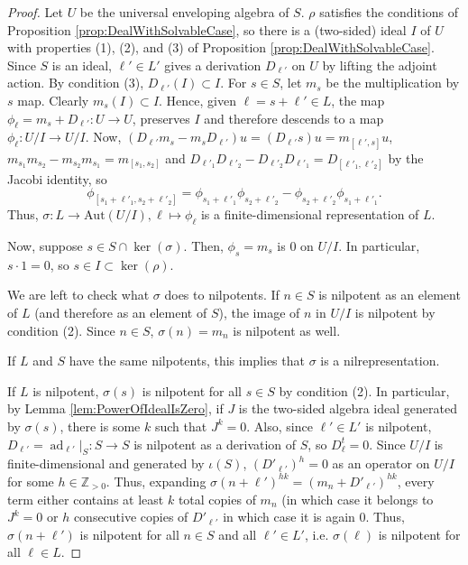 \documentclass[10pt]{amsart}
\theoremstyle{definition}
\theoremstyle{remark}
\numberwithin{equation}{section}
\newcommand{\bbZ}{\mathbb Z}
\DeclareMathOperator{\ad}{ad}
\begin{document}
\begin{proof} Let $U$ be the universal enveloping algebra of $S$.
$\rho$ satisfies the conditions of Proposition \ref{prop:DealWithSolvableCase}, so there is a (two-sided) ideal $I$ of $U$ with properties (1), (2), and (3) of Proposition \ref{prop:DealWithSolvableCase}. Since $S$ is an ideal, $\ell' \in L'$ gives a derivation $D_{\ell'}$ on $U$ by lifting the adjoint action. By condition (3), $D_{\ell'}(I) \subset I$. For $s \in S$, let $m_{s}$ be the multiplication by $s$ map. Clearly $m_{s}(I) \subset I$. Hence, given $\ell = s + \ell' \in L$, the map $\phi_{\ell} = m_{s} + D_{\ell'}: U \to U$, preserves $I$ and therefore descends to a map $\phi_{\ell}: U/I \to U/I$. Now, $(D_{\ell'} m_s - m_s D_{\ell'}) u = (D_{\ell'}s) u  = m_{[\ell',s]} u$, $m_{s_1} m_{s_2} - m_{s_2} m_{s_1}  = m_{[s_1,s_2]}$ and $D_{\ell'_1} D_{\ell'_2} - D_{\ell'_2}D_{\ell'_1} = D_{[\ell'_1, \ell'_2]}$ by the Jacobi identity, so 
\[
\phi_{[s_1 + \ell'_1, s_2 +\ell'_2]} = \phi_{s_1 + \ell'_1} \phi_{s_2 + \ell'_2} - \phi_{s_2 + \ell'_2} \phi_{s_1 + \ell'_1}.
\]
Thus, $\sigma: L \to \text{Aut}(U/I), \ell \mapsto \phi_{\ell}$ is a finite-dimensional representation of $L$.

Now, suppose $s \in S \cap \ker(\sigma)$. Then, $\phi_{s} = m_{s}$ is $0$ on $U/I$. In particular, $s \cdot 1 = 0$, so $s \in I \subset \ker(\rho)$.

We are left to check what $\sigma$ does to nilpotents. If $n \in S$ is nilpotent as an element of $L$ (and therefore as an element of $S$), the image of $n$ in $U/I$ is nilpotent by condition (2). Since $n \in S$, $\sigma(n) = m_{n}$ is nilpotent as well. 

If $L$ and $S$ have the same nilpotents, this implies that $\sigma$ is a nilrepresentation.

If $L$ is nilpotent, $\sigma(s)$ is nilpotent for all $s \in S$ by condition (2). In particular, by Lemma \ref{lem:PowerOfIdealIsZero}, if $J$ is the two-sided algebra ideal generated by $\sigma(s)$, there is some $k$ such that $J^{k} = 0$. Also, since $\ell' \in L'$ is nilpotent, $D_{\ell'} = \ad_{\ell'}|_{S}: S \to S$ is nilpotent as a derivation of $S$, so $D_{\ell}^{t} = 0$. Since $U/I$ is finite-dimensional and generated by $\iota(S)$, $(D'_{\ell'})^{h} = 0$ as an operator on $U/I$ for some $h \in \bbZ_{>0}$. Thus, expanding $\sigma(n + \ell')^{hk} = (m_n + D'_{\ell'})^{hk}$, every term either contains at least $k$ total copies of $m_{n}$ (in which case it belongs to $J^{k} = 0$ or $h$ consecutive copies of $D'_{\ell'}$ in which case it is again $0$. Thus, $\sigma(n + \ell')$ is nilpotent for all $n \in S$ and all $\ell' \in L'$, i.e. $\sigma(\ell)$ is nilpotent for all $\ell \in L$.
\end{proof}
\end{document}
